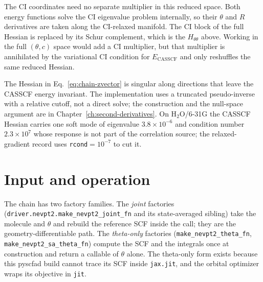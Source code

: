 The CI coordinates need no separate multiplier in this reduced space.
Both energy functions solve the CI eigenvalue problem internally, so
their $\theta$ and $R$ derivatives are taken along the CI-relaxed
manifold.  The CI block of the full Hessian is replaced by its Schur
complement, which is the $H_{\theta\theta}$ above.  Working in the full
$(\theta,c)$ space would add a CI multiplier, but that multiplier is
annihilated by the variational CI condition for $E_{\mathrm{CASSCF}}$
and only reshuffles the same reduced Hessian.

The Hessian in Eq.~\eqref{eq:chain-zvector} is singular along
directions that leave the CASSCF energy invariant.  The implementation
uses a truncated pseudo-inverse with a relative cutoff, not a direct
solve; the construction and the null-space argument are in
Chapter~\ref{ch:second-derivatives}.  On H$_2$O/6-31G the CASSCF
Hessian carries one soft mode of eigenvalue $3.8\times10^{-6}$ and
condition number $2.3\times10^{7}$ whose response is not part of the
correlation source; the relaxed-gradient record uses
\texttt{rcond}$=10^{-7}$ to cut it.

\section{Input and operation}
\label{sec:chain-input}

The chain has two factory families.  The \emph{joint} factories
(\texttt{driver.nevpt2.make\_nevpt2\_joint\_fn} and its state-averaged
sibling) take the molecule and $\theta$ and rebuild the reference SCF
inside the call; they are the geometry-differentiable path.  The
\emph{theta-only} factories
(\texttt{make\_nevpt2\_theta\_fn}, \texttt{make\_nevpt2\_sa\_theta\_fn})
compute the SCF and the integrals once at construction and return a
callable of $\theta$ alone.  The theta-only form exists because this
pyscfad build cannot trace its SCF inside \texttt{jax.jit}, and the
orbital optimizer wraps its objective in \texttt{jit}.

